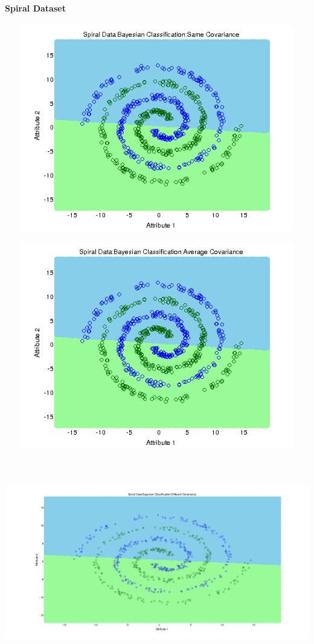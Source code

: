 \documentclass[a4paper]{article}
\begin{document}
			\paragraph{Spiral Dataset}
			
			\centerline{\includegraphics[width=160mm,height=90mm]{plots/bayes/nls/spiral/same_cov.png}}
 			\centerline{\includegraphics[width=160mm,height=90mm]{plots/bayes/nls/spiral/avg_cov.png}}
 			\centerline{\includegraphics[width=160mm,height=90mm]{plots/bayes/nls/spiral/diff_cov.png}}
\end{document}
